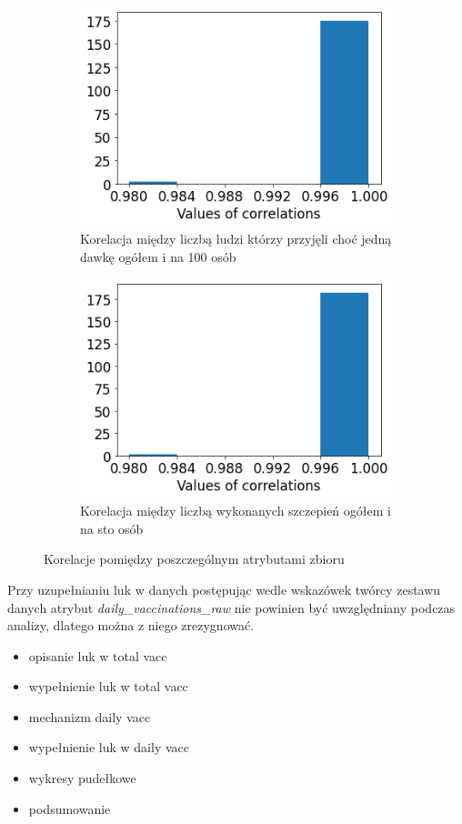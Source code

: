 \documentclass[12pt, oneside, openany]{article}
\begin{document}
\begin{figure}
  \begin{subfigure}[t]{.45\textwidth}
    \centering
    \includegraphics[width=\linewidth]{../img/null_column_diff3.png}
    \caption{Korelacja między liczbą ludzi którzy przyjęli choć jedną dawkę ogółem i na 100 osób}
  \end{subfigure}
  \hfill
  \begin{subfigure}[t]{.45\textwidth}
    \centering
    \includegraphics[width=\linewidth]{../img/null_column_diff4.png}
    \caption{Korelacja między liczbą wykonanych szczepień ogółem i na sto osób}
  \end{subfigure}
  \caption{Korelacje pomiędzy poszczególnym atrybutami zbioru}
\label{Rys:hist}
\end{figure}

Przy uzupełnianiu luk w danych postępując wedle wskazówek twórcy zestawu danych atrybut \textit{daily\_vaccinations\_raw} nie powinien być uwzględniany podczas analizy, dlatego można z niego zrezygnować. 


\begin{itemize}
\item opisanie luk w total vacc
\item wypełnienie luk w total vacc
\item mechanizm daily vacc
\item wypełnienie luk w daily vacc
\item wykresy pudełkowe
\item podsumowanie
\end{itemize}
\end{document}
